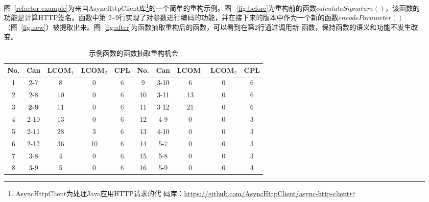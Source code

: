 图~\ref{refactor-example}为来自AsyncHttpClient库\footnote{AsyncHttpClient为处理Java应用HTTP请求的代
码库：\url{https://github.com/AsyncHttpClient/async-http-client}}的一个简单的重构示例。图
~\ref{fig:before}为重构前的函数$calculateSignature()$，该函数的功能是计算HTTP签名。函数中第
2\textasciitilde9行实现了对参数进行编码的功能，并在接下来的版本中作为一个新的函数$encodeParameter()$
（图~\ref{fig:new}）被提取出来。图~\ref{fig:after}为函数抽取重构后的函数，可以看到在第2行通过调用新
函数，保持函数的语义和功能不发生改变。

\begin{table}[!t]
\zihaowu
  \renewcommand{\arraystretch}{1.3}
  \caption{示例函数的函数抽取重构机会}
  \label{example_metrics}
  \centering
  \begin{tabular}{ccccc|ccccc}
  \toprule No.&Can&LCOM$_1$&LCOM$_2$&CPL &No.&Can&LCOM$_1$&LCOM$_2$&CPL\\ \midrule 1 &2-7 &8 &0 &6
   &9 &3-10 &6 &0 &6\\
   2 &2-8 &10 &0 &6 &10 &3-11 &13 &0 &6\\
   3 &\textbf{2-9} &11 &0 &6 &11 &3-12 &21 &0 &6\\
   4 &2-10 &13 &0 &6 &12 &4-9 &0 &0 &3\\
   5 &2-11 &28 &3 &6 &13 &4-10 &0 &0 &3\\
   6 &2-12 &36 &10 &6 &14 &5-7 &0 &0 &3\\
   7 &3-8 &4 &0 &6 &15 &5-8 &0 &0 &3\\
   8 &3-9 &5 &0 &6 &16 &5-9 &0 &0 &4\\
   \bottomrule
  \end{tabular}
\end{table}

